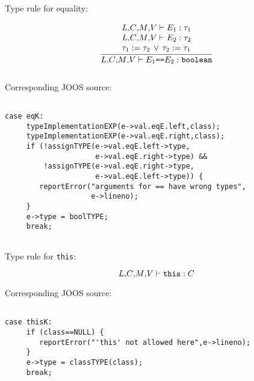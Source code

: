 \begin{slide*}
Type rule for equality:


$$ \frac{\begin{array}{l}
          \lib{},\!\class{},\!\method{},\!\vars{} \vdash E_1: \tau_1\\
          \lib{},\!\class{},\!\method{},\!\vars{} \vdash E_2: \tau_2\\
          \tau_1:=\tau_2\,\vee\,\tau_2:=\tau_1\end{array}}{
          \lib{},\!\class{},\!\method{},\!\vars{} \vdash E_1 \mbox{\tt ==} E_2: \mbox{\tt boolean}} $$\\

Corresponding JOOS source:
 
\begin{scriptsize}
\begin{verbatim}
 
case eqK:
     typeImplementationEXP(e->val.eqE.left,class);
     typeImplementationEXP(e->val.eqE.right,class);
     if (!assignTYPE(e->val.eqE.left->type,
                     e->val.eqE.right->type) &&
         !assignTYPE(e->val.eqE.right->type,
                     e->val.eqE.left->type)) {
        reportError("arguments for == have wrong types",
                    e->lineno);
     }
     e->type = boolTYPE;
     break;
 
\end{verbatim}
\end{scriptsize}
        
\vfil
\end{slide*}
 
\begin{slide*}
Type rule for {\tt this}:

$$ \mbox{$L$}{},\!\mbox{$C$}{},\!\mbox{$M$}{},\!\mbox{$V$}{} \vdash \mbox{\tt this}: \mbox{$C$}{} $$

Corresponding JOOS source:
 
\begin{scriptsize}
\begin{verbatim}
 
case thisK:
     if (class==NULL) {
        reportError("'this' not allowed here",e->lineno);
     }
     e->type = classTYPE(class);
     break;
 
\end{verbatim}
\end{scriptsize}
 
\vfil
\end{slide*}
 
